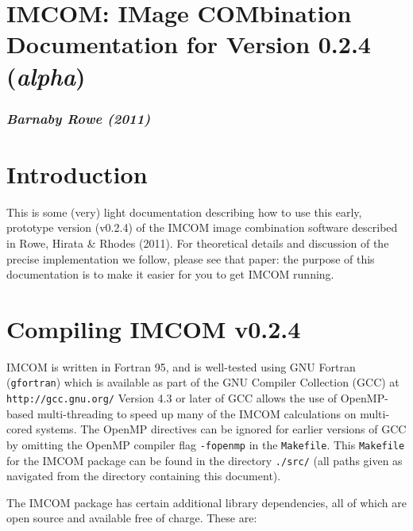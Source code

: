 \documentclass[10pt]{article}
\begin{document}
\setlength{\parskip}{2.0ex plus 0.5ex minus 0.5ex}
\setlength{\parindent}{0cm} 

\section*{IMCOM: IMage COMbination \\ Documentation for Version 0.2.4 (\emph{alpha})}
\subsubsection*{\emph{Barnaby Rowe (2011)}}

\section{Introduction}
This is some (very) light documentation describing how to use this early, prototype version (v0.2.4) of the IMCOM image combination software described in Rowe, Hirata \& Rhodes (2011).  For theoretical details and discussion of the precise implementation we follow, please see that paper: the purpose of this documentation is to make it easier for you to get IMCOM running.

\section{Compiling IMCOM v0.2.4}
IMCOM is written in Fortran 95, and is well-tested using GNU Fortran (\texttt{gfortran}) which is available as part of the GNU Compiler Collection (GCC) at \newline
\texttt{http://gcc.gnu.org/} \newline
Version 4.3 or later of GCC allows the use of OpenMP-based multi-threading to speed up many of the IMCOM calculations on multi-cored systems.  The OpenMP directives can be ignored for earlier versions of GCC by omitting the OpenMP compiler flag \texttt{-fopenmp} in the \texttt{Makefile}.  This \texttt{Makefile} for the IMCOM package can be found in the directory \texttt{./src/} (all paths given as navigated from the directory containing this document).

The IMCOM package has certain additional library dependencies, all of which are open source and available free of charge.  These are:
\end{document}
